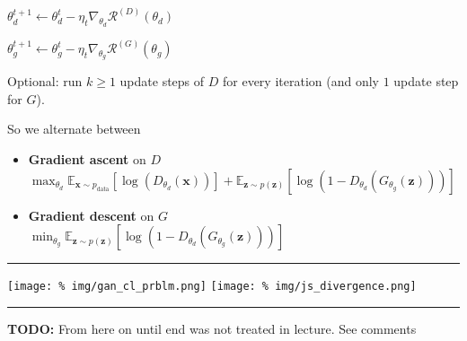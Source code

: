 \documentclass[a2paper,8pt]{extarticle}
\newcommand{\cN}{\mathcal{N}}
\newcommand{\cR}{\mathcal{R}}
\newcommand{\Exp}[2][]{{\mathbb{E}_{#1}}\left[ #2
\right]}
\newcommand{\mat}[1]{\mathbf{#1}}
\renewcommand{\vec}[1]{\mathbf{#1}}
\newcommand{\vx}{\vec{x}}
\newcommand{\vz}{\vec{z}}
\newcommand{\vmu}{\boldsymbol{\mu}}
\newcommand{\MSigma}{\mat{\Sigma}}
\newcommand{\todo}[1]{\textbf{TODO:} #1}
\newcommand{\todo}[1]{%
}
\newcommand{\sep}{\vspace{0pt}\noindent\hrule\vspace{0pt}}
\newcommand{\sep}{\vspace{5pt}\noindent\hrule\vspace{5pt}}
\begin{document}
\begin{landscape}
\begin{multicols*}{7}
$\theta_d^{t+1}\gets\theta_d^t-\eta_t\nabla_{\theta_d}\cR^{(D)}(\theta_d)$

$\theta_g^{t+1}\gets\theta_g^t-\eta_t\nabla_{\theta_g}\cR^{(G)}(\theta_g)$

Optional: run $k\geq 1$ update steps of $D$ for every iteration (and only
$1$ update step for $G$).

So we alternate between
\begin{itemize}
  \item \textbf{Gradient ascent} on $D$\\
  $
\max_{\theta_d}
\Exp[\vx\sim p_{\text{data}}]{\log(D_{\theta_d}(\vx))}
+
\Exp[\vz\sim p(\vz)]{\log(1-D_{\theta_d}(G_{\theta_g}(\vz)))}
  $
  \item \textbf{Gradient descent} on $G$\\
  $
\min_{\theta_g}
\Exp[\vz\sim p(\vz)]{\log(1-D_{\theta_d}(G_{\theta_g}(\vz)))}
  $
\end{itemize}

\sep
\begin{center}
  \texttt{[image: \%
img/gan\_cl\_prblm.png]}
  \texttt{[image: \%
img/js\_divergence.png]}
\end{center}

\sep

\todo{From here on until end was not treated in lecture. See comments}

\end{multicols*}
\end{landscape}
\end{document}
